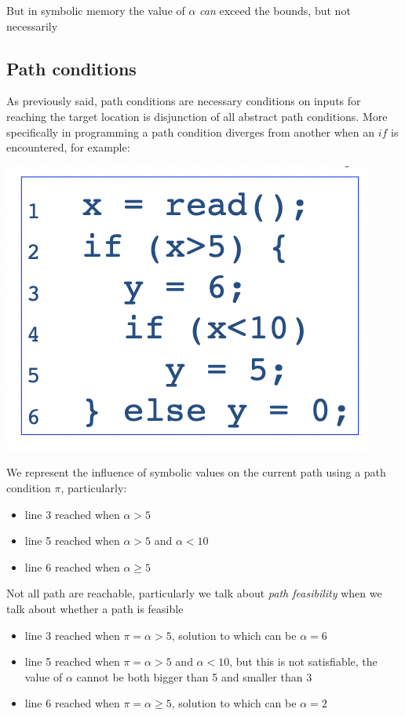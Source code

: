 \documentclass[11pt, oneside]{article}   	%
\begin{document}
But in symbolic memory the value of $\alpha$ \emph{can} exceed the bounds, but not necessarily

\subsection*{Path conditions}
As previously said, path conditions are necessary conditions on inputs for reaching the target location is disjunction of all abstract path conditions. More specifically in programming a path condition diverges from another when an $if$ is encountered, for example:
\begin{center}
\includegraphics[scale = 0.4]{dov5}
\end{center}
We represent the influence of symbolic values on the current path using a path condition $\pi$, particularly:\begin{itemize}
\item line 3 reached when $\alpha > 5$
\item line 5 reached when $\alpha > 5$ and $\alpha < 10$
\item line 6 reached when $\alpha \geq 5$
\end{itemize}
Not all path are reachable, particularly we talk about \emph{path feasibility} when we talk about whether a path is feasible 
\begin{itemize}
\item line 3 reached when $\pi = \alpha > 5$, solution to which can be $\alpha = 6$
\item line 5 reached when $\pi = \alpha > 5$ and $\alpha < 10$, but this is not satisfiable, the value of $\alpha$ cannot be both bigger than 5 and smaller than 3
\item line 6 reached when $\pi = \alpha \geq 5$, solution to which can be $\alpha = 2$
\end{itemize}
\end{document}
